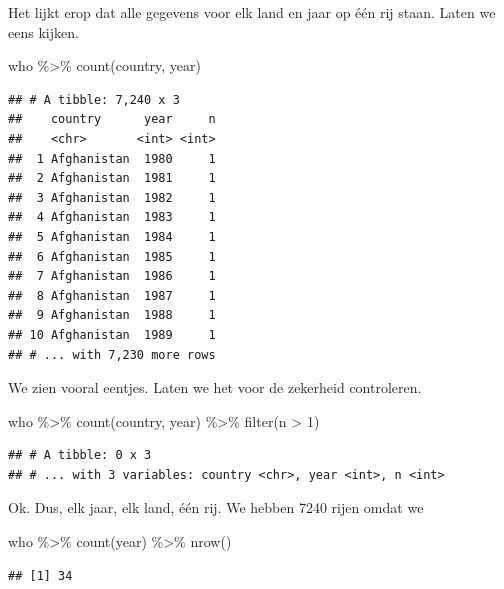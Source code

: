 \documentclass[]{tufte-book}
\newenvironment{Shaded}{}{}
\newcommand{\DecValTok}[1]{\textcolor[rgb]{0.25,0.63,0.44}{#1}}
\newcommand{\FunctionTok}[1]{\textcolor[rgb]{0.02,0.16,0.49}{#1}}
\newcommand{\NormalTok}[1]{#1}
\newcommand{\SpecialCharTok}[1]{\textcolor[rgb]{0.25,0.44,0.63}{#1}}
\begin{document}
Het lijkt erop dat alle gegevens voor elk land en jaar op één rij staan. Laten we eens kijken.

\begin{Shaded}
\begin{Highlighting}[]
\NormalTok{who }\SpecialCharTok{\%\textgreater{}\%}
  \FunctionTok{count}\NormalTok{(country, year)}
\end{Highlighting}
\end{Shaded}

\begin{verbatim}
## # A tibble: 7,240 x 3
##    country      year     n
##    <chr>       <int> <int>
##  1 Afghanistan  1980     1
##  2 Afghanistan  1981     1
##  3 Afghanistan  1982     1
##  4 Afghanistan  1983     1
##  5 Afghanistan  1984     1
##  6 Afghanistan  1985     1
##  7 Afghanistan  1986     1
##  8 Afghanistan  1987     1
##  9 Afghanistan  1988     1
## 10 Afghanistan  1989     1
## # ... with 7,230 more rows
\end{verbatim}

We zien vooral eentjes. Laten we het voor de zekerheid controleren.

\begin{Shaded}
\begin{Highlighting}[]
\NormalTok{who }\SpecialCharTok{\%\textgreater{}\%}
  \FunctionTok{count}\NormalTok{(country, year) }\SpecialCharTok{\%\textgreater{}\%}
  \FunctionTok{filter}\NormalTok{(n }\SpecialCharTok{\textgreater{}} \DecValTok{1}\NormalTok{)}
\end{Highlighting}
\end{Shaded}

\begin{verbatim}
## # A tibble: 0 x 3
## # ... with 3 variables: country <chr>, year <int>, n <int>
\end{verbatim}

Ok. Dus, elk jaar, elk land, één rij. We hebben 7240 rijen omdat we

\begin{Shaded}
\begin{Highlighting}[]
\NormalTok{who }\SpecialCharTok{\%\textgreater{}\%}
  \FunctionTok{count}\NormalTok{(year) }\SpecialCharTok{\%\textgreater{}\%}
  \FunctionTok{nrow}\NormalTok{()}
\end{Highlighting}
\end{Shaded}

\begin{verbatim}
## [1] 34
\end{verbatim}
\end{document}
